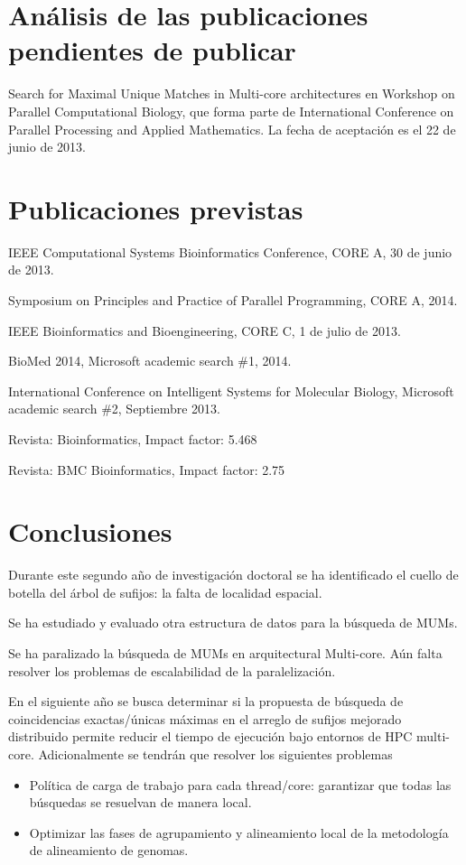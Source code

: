 \documentclass[12pt,a4paper]{article}
\begin{document}
\section{Análisis de las publicaciones pendientes de publicar}
Search for Maximal Unique Matches in Multi-core architectures en Workshop on Parallel Computational Biology, que forma parte de International Conference on Parallel Processing and Applied Mathematics. La fecha de aceptación es el 22 de junio de 2013.
\section{Publicaciones previstas}
IEEE Computational Systems Bioinformatics Conference, CORE A, 30 de junio de 2013. 

Symposium on Principles and Practice of Parallel Programming, CORE A, 2014.

IEEE Bioinformatics and Bioengineering, CORE C, 1 de julio de 2013.

BioMed 2014, Microsoft academic search \#1, 2014.

International Conference on Intelligent Systems for Molecular Biology, Microsoft academic search \#2, Septiembre 2013.

Revista: Bioinformatics, Impact factor: 5.468

Revista: BMC Bioinformatics, Impact factor: 2.75
\section{Conclusiones}
\indent
Durante este segundo año de investigación doctoral se ha identificado el cuello de botella del árbol de sufijos: la falta de localidad espacial.

Se ha estudiado y evaluado otra estructura de datos para la búsqueda de MUMs.

Se ha paralizado la búsqueda de MUMs en arquitectural Multi-core. Aún falta resolver los problemas de escalabilidad de la paralelización.

En el siguiente año se busca determinar si la propuesta de búsqueda de coincidencias exactas/únicas máximas en el arreglo de sufijos mejorado distribuido permite reducir el tiempo de ejecución bajo entornos de HPC multi-core. Adicionalmente se tendrán que resolver los siguientes problemas
\begin{itemize}
  \item Política de carga de trabajo para cada thread/core: garantizar que todas las búsquedas se resuelvan de manera local.
  \item Optimizar las fases de agrupamiento y alineamiento local de la metodología de alineamiento de genomas.
\end{itemize}
 
	
\end{document}
